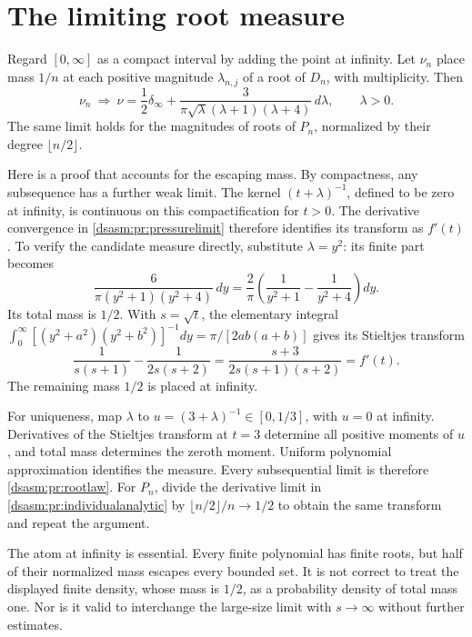 \documentclass[11pt,letterpaper]{article}
\theoremstyle{remark}\newtheorem{remark}[theorem]{Remark}
\begin{document}
\section{The limiting root measure}
\label{dsasm:pr:sec:rootmeasure}
Regard $[0,\infty]$ as a compact interval by adding the point at
infinity. Let $\nu_n$ place mass $1/n$ at each positive magnitude
$\lambda_{n,j}$ of a root of $D_n$, with multiplicity.
Then
\begin{equation}\label{dsasm:pr:rootlaw}
 \nu_n\ \Longrightarrow\
 \nu=\frac12\delta_\infty+
 \frac{3}{\pi\sqrt\lambda(\lambda+1)(\lambda+4)}\,d\lambda,
 \qquad\lambda>0.
\end{equation}
The same limit holds for the magnitudes of roots of $P_n$, normalized
by their degree $\lfloor n/2\rfloor$.

Here is a proof that accounts for the escaping mass. By compactness,
any subsequence has a further weak limit. The kernel
$(t+\lambda)^{-1}$, defined to be zero at infinity, is continuous on
this compactification for $t>0$. The derivative convergence in
\eqref{dsasm:pr:pressurelimit} therefore identifies its transform as $f'(t)$.
To verify the candidate measure directly, substitute $\lambda=y^2$:
its finite part becomes
\[
 \frac6{\pi(y^2+1)(y^2+4)}\,dy
 =\frac2\pi\left(\frac1{y^2+1}-\frac1{y^2+4}\right)dy.
\]
Its total mass is $1/2$. With $s=\sqrt t$, the elementary integral
$\int_0^\infty[(y^2+a^2)(y^2+b^2)]^{-1}dy
 =\pi/[2ab(a+b)]$ gives its Stieltjes transform
\[
 \frac1{s(s+1)}-\frac1{2s(s+2)}
 =\frac{s+3}{2s(s+1)(s+2)}=f'(t).
\]
The remaining mass $1/2$ is placed at infinity.

For uniqueness, map $\lambda$ to $u=(3+\lambda)^{-1}\in[0,1/3]$,
with $u=0$ at infinity. Derivatives of the Stieltjes transform at
$t=3$ determine all positive moments of $u$, and total mass determines
the zeroth moment. Uniform polynomial approximation identifies the
measure. Every subsequential limit is therefore \eqref{dsasm:pr:rootlaw}.
For $P_n$, divide the derivative limit in
\eqref{dsasm:pr:individualanalytic} by $\lfloor n/2\rfloor/n\to1/2$ to
obtain the same transform and repeat the argument.

The atom at infinity is essential. Every finite polynomial has finite
roots, but half of their normalized mass escapes every bounded set.
It is not correct to treat the displayed finite density, whose mass
is $1/2$, as a probability density of total mass one. Nor is it valid
to interchange the large-size limit with $s\to\infty$ without further
estimates.
\end{document}
